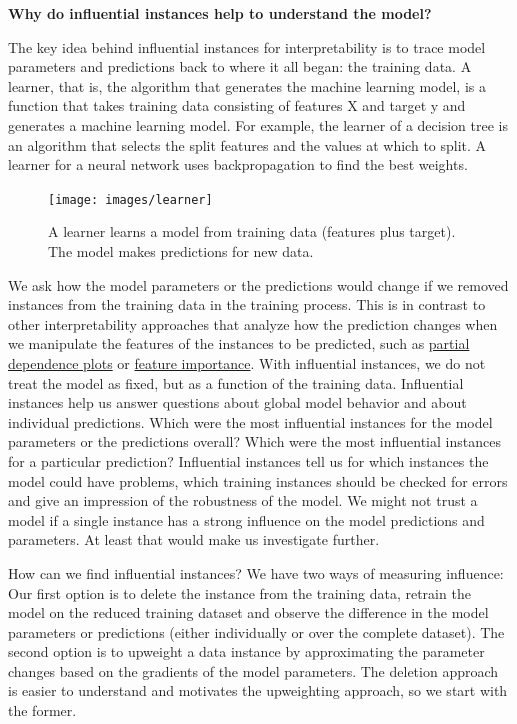 \documentclass[
  10pt,
]{scrbook}
\begin{document}
\textbf{Why do influential instances help to understand the model?}

The key idea behind influential instances for interpretability is to trace model parameters and predictions back to where it all began: the training data.
A learner, that is, the algorithm that generates the machine learning model, is a function that takes training data consisting of features X and target y and generates a machine learning model.
For example, the learner of a decision tree is an algorithm that selects the split features and the values at which to split.
A learner for a neural network uses backpropagation to find the best weights.

\begin{figure}

{\centering \texttt{[image: images/learner]} 

}

\caption{A learner learns a model from training data (features plus target). The model makes predictions for new data.}\label{fig:learner}
\end{figure}

We ask how the model parameters or the predictions would change if we removed instances from the training data in the training process.
This is in contrast to other interpretability approaches that analyze how the prediction changes when we manipulate the features of the instances to be predicted, such as \protect\hyperlink{pdp}{partial dependence plots} or \protect\hyperlink{feature-importance}{feature importance}.
With influential instances, we do not treat the model as fixed, but as a function of the training data.
Influential instances help us answer questions about global model behavior and about individual predictions.
Which were the most influential instances for the model parameters or the predictions overall?
Which were the most influential instances for a particular prediction?
Influential instances tell us for which instances the model could have problems, which training instances should be checked for errors and give an impression of the robustness of the model.
We might not trust a model if a single instance has a strong influence on the model predictions and parameters.
At least that would make us investigate further.

How can we find influential instances?
We have two ways of measuring influence:
Our first option is to delete the instance from the training data, retrain the model on the reduced training dataset and observe the difference in the model parameters or predictions (either individually or over the complete dataset).
The second option is to upweight a data instance by approximating the parameter changes based on the gradients of the model parameters.
The deletion approach is easier to understand and motivates the upweighting approach, so we start with the former.
\end{document}
